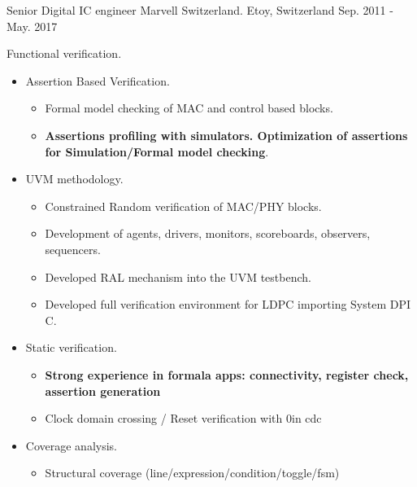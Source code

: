 \begin{cventries}

  \cventry
    {Senior Digital IC engineer} %
    {Marvell Switzerland.} %
    {Etoy, Switzerland} %
    {Sep. 2011 - May. 2017} %
    {
      \begin{cvitems} %
        \item {Functional verification.}
        \begin{itemize}
          \item {Assertion Based Verification.}
          \begin{itemize}
            \item {Formal model checking of MAC and control based blocks.}
            \item {\textbf{Assertions profiling with simulators. Optimization of assertions for Simulation/Formal model checking}.}
          \end{itemize}
          \item {UVM methodology.}
          \begin{itemize}
            \item {Constrained Random verification of MAC/PHY blocks.}
            \item {Development of agents, drivers, monitors, scoreboards, observers, sequencers.}
            \item {Developed RAL mechanism into the UVM testbench.}
            \item {Developed full verification environment for LDPC importing System DPI C.}
          \end{itemize}
          \item {Static verification.}
          \begin{itemize}
            \item {\textbf{Strong experience in formala apps: connectivity, register check, assertion generation}}
            \item {Clock domain crossing / Reset verification with 0in cdc}
          \end{itemize}
          \item {Coverage analysis.}
          \begin{itemize}
            \item {Structural coverage (line/expression/condition/toggle/fsm)}

\end{itemize}
\end{itemize}
\end{cvitems}}
\end{cventries}
